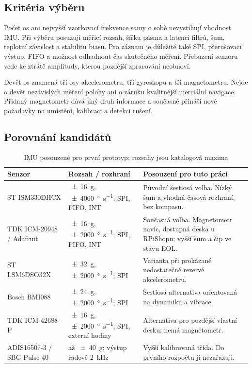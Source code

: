 \subsection{Kritéria výběru}

Počet os ani nejvyšší vzorkovací frekvence samy o sobě nevystihují vhodnost
IMU. Při výběru posuzuji měřicí rozsah, šířku pásma a latenci filtrů, šum,
teplotní závislost a stabilitu biasu. Pro záznam je důležité také SPI,
přerušovací výstup, FIFO a možnost odhadnout čas skutečného měření. Přebuzení
senzoru vede ke ztrátě amplitudy, kterou pozdější zpracování neobnoví.

Devět os znamená tři osy akcelerometru, tři gyroskopu a tři magnetometru.
Nejde o devět nezávislých měření polohy ani o záruku kvalitnější inerciální
navigace. Přidaný magnetometr dává jiný druh informace a současně přináší
nové požadavky na umístění, kalibraci a detekci rušení.

\subsection{Porovnání kandidátů}

\begin{table}[htbp]
  \centering
  \scriptsize
  \caption{IMU posouzené pro první prototyp; rozsahy jsou katalogová maxima}
  \label{tab:imu}
  \begin{tabularx}{\textwidth}{@{}L{0.22\textwidth}L{0.24\textwidth}Y@{}}
    \toprule
    Senzor & Rozsah / rozhraní & Posouzení pro tuto práci \\
    \midrule
    ST ISM330DHCX
      & \SI{\pm16}{g}, \SI{\pm4000}{\degree\per\second}; SPI, FIFO, INT
      & Původní šestiosá volba. Nízký šum a vhodná časová rozhraní, bez kompasu.
        \cite{st-ism330dhcx,st-ism330dhcx-ds} \\
    TDK ICM-20948 / Adafruit
      & \SI{\pm16}{g}, \SI{\pm2000}{\degree\per\second}; SPI, FIFO, INT
      & Současná volba. Magnetometr navíc, dostupná deska u RPiShopu;
        vyšší šum a čip ve stavu EOL.
        \cite{tdk-icm20948,adafruit-icm20948,tdk-icm20948-status} \\
    ST LSM6DSO32X
      & \SI{\pm32}{g}, \SI{\pm2000}{\degree\per\second}; SPI
      & Varianta při prokázané nedostatečné rezervě akcelerometru.
        \cite{st-lsm6dso32x} \\
    Bosch BMI088
      & \SI{\pm24}{g}, \SI{\pm2000}{\degree\per\second}; SPI
      & Šestiosá alternativa orientovaná na dynamiku a vibrace.
        \cite{bosch-bmi088} \\
    TDK ICM-42688-P
      & \SI{\pm16}{g}, \SI{\pm2000}{\degree\per\second}; SPI, externí hodiny
      & Alternativa pro pozdější vlastní desku; nemá magnetometr.
        \cite{tdk-icm42688p} \\
    ADIS16507-3 / SBG Pulse-40
      & až \SI{\pm40}{g}; výstup řádově \SI{2}{kHz}
      & Vyšší kalibrovaná třída. Do prvního rozpočtu ji nezařazuji.
        \cite{adis16507,sbg-pulse40} \\
    \bottomrule
  \end{tabularx}
\end{table}

